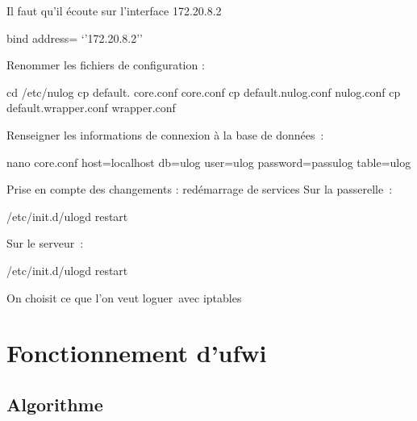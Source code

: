 \documentclass[12pt]{report}
\begin{document}
\begin{itemize}
Il faut qu’il écoute sur l’interface 172.20.8.2

bind address= ‘’172.20.8.2’’

Renommer les fichiers de configuration :

cd /etc/nulog
cp default. core.conf core.conf
cp default.nulog.conf nulog.conf
cp default.wrapper.conf wrapper.conf

Renseigner les informations de connexion à la base de données :

nano core.conf
host=localhost
db=ulog
user=ulog
password=passulog
table=ulog

Prise en compte des changements : redémarrage de services
Sur la passerelle :

/etc/init.d/ulogd restart

Sur le serveur :

/etc/init.d/ulogd restart


On choisit ce que l’on veut loguer avec iptables

\chapter{Fonctionnement d'ufwi}
\section{Algorithme}


\end{itemize}
\end{document}
